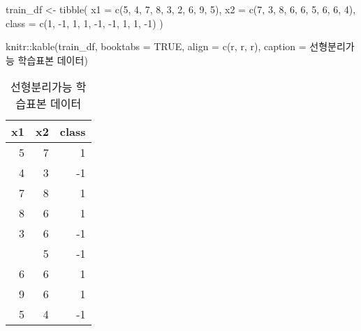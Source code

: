 \documentclass[
]{book}
\newenvironment{Shaded}{\begin{snugshade}}{\end{snugshade}}
\newcommand{\AttributeTok}[1]{\textcolor[rgb]{0.77,0.63,0.00}{#1}}
\newcommand{\ConstantTok}[1]{\textcolor[rgb]{0.00,0.00,0.00}{#1}}
\newcommand{\DecValTok}[1]{\textcolor[rgb]{0.00,0.00,0.81}{#1}}
\newcommand{\FunctionTok}[1]{\textcolor[rgb]{0.00,0.00,0.00}{#1}}
\newcommand{\NormalTok}[1]{#1}
\newcommand{\OtherTok}[1]{\textcolor[rgb]{0.56,0.35,0.01}{#1}}
\newcommand{\SpecialCharTok}[1]{\textcolor[rgb]{0.00,0.00,0.00}{#1}}
\newcommand{\StringTok}[1]{\textcolor[rgb]{0.31,0.60,0.02}{#1}}
\begin{document}
\begin{Shaded}
\begin{Highlighting}[]
\NormalTok{train\_df }\OtherTok{\textless{}{-}} \FunctionTok{tibble}\NormalTok{(}
  \AttributeTok{x1 =} \FunctionTok{c}\NormalTok{(}\DecValTok{5}\NormalTok{, }\DecValTok{4}\NormalTok{, }\DecValTok{7}\NormalTok{, }\DecValTok{8}\NormalTok{, }\DecValTok{3}\NormalTok{, }\DecValTok{2}\NormalTok{, }\DecValTok{6}\NormalTok{, }\DecValTok{9}\NormalTok{, }\DecValTok{5}\NormalTok{),}
  \AttributeTok{x2 =} \FunctionTok{c}\NormalTok{(}\DecValTok{7}\NormalTok{, }\DecValTok{3}\NormalTok{, }\DecValTok{8}\NormalTok{, }\DecValTok{6}\NormalTok{, }\DecValTok{6}\NormalTok{, }\DecValTok{5}\NormalTok{, }\DecValTok{6}\NormalTok{, }\DecValTok{6}\NormalTok{, }\DecValTok{4}\NormalTok{),}
  \AttributeTok{class =} \FunctionTok{c}\NormalTok{(}\DecValTok{1}\NormalTok{, }\SpecialCharTok{{-}}\DecValTok{1}\NormalTok{, }\DecValTok{1}\NormalTok{, }\DecValTok{1}\NormalTok{, }\SpecialCharTok{{-}}\DecValTok{1}\NormalTok{, }\SpecialCharTok{{-}}\DecValTok{1}\NormalTok{, }\DecValTok{1}\NormalTok{, }\DecValTok{1}\NormalTok{, }\SpecialCharTok{{-}}\DecValTok{1}\NormalTok{)}
\NormalTok{)}

\NormalTok{knitr}\SpecialCharTok{::}\FunctionTok{kable}\NormalTok{(train\_df, }\AttributeTok{booktabs =} \ConstantTok{TRUE}\NormalTok{,}
             \AttributeTok{align =} \FunctionTok{c}\NormalTok{(}\StringTok{\textquotesingle{}r\textquotesingle{}}\NormalTok{, }\StringTok{\textquotesingle{}r\textquotesingle{}}\NormalTok{, }\StringTok{\textquotesingle{}r\textquotesingle{}}\NormalTok{),}
             \AttributeTok{caption =} \StringTok{\textquotesingle{}선형분리가능 학습표본 데이터\textquotesingle{}}\NormalTok{)}
\end{Highlighting}
\end{Shaded}

\begin{table}

\caption{\label{tab:svm-train-data-table}선형분리가능 학습표본 데이터}
\centering
\begin{tabular}[t]{rrr}
\toprule
x1 & x2 & class\\
\midrule
5 & 7 & 1\\
4 & 3 & -1\\
7 & 8 & 1\\
8 & 6 & 1\\
3 & 6 & -1\\
\addlinespace
2 & 5 & -1\\
6 & 6 & 1\\
9 & 6 & 1\\
5 & 4 & -1\\
\bottomrule
\end{tabular}
\end{table}
\end{document}
